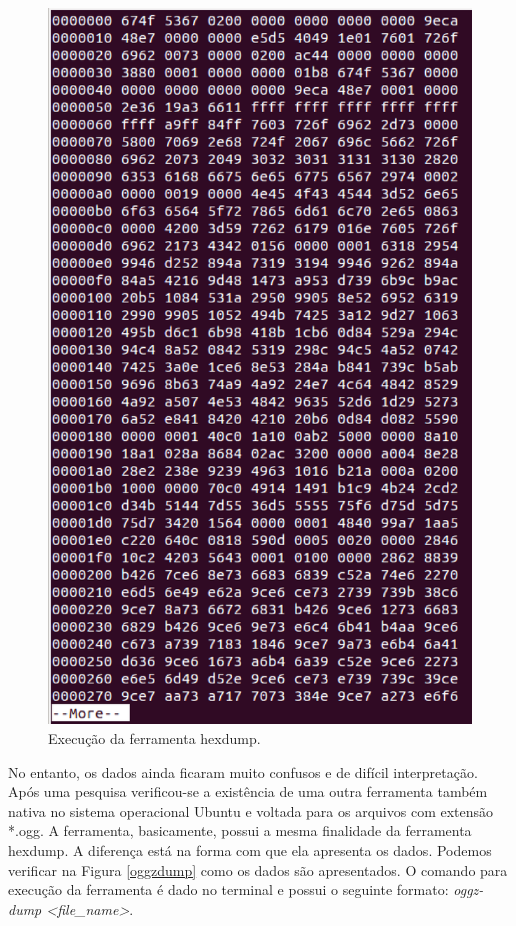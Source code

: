  \begin{figure}[ht]
	\centering
		\includegraphics[keepaspectratio=true,scale=0.5]{figuras/hexdump.eps}
	\caption{Execução da ferramenta hexdump.}
	\label{hexdump}
\end{figure}

No entanto, os dados ainda ficaram muito confusos e de difícil interpretação. Após uma pesquisa verificou-se a existência de uma outra ferramenta também nativa no sistema operacional Ubuntu e voltada para os arquivos com extensão *.ogg. A ferramenta, basicamente, possui a mesma finalidade da ferramenta hexdump. A diferença está na forma com que ela apresenta os dados. Podemos verificar na Figura \ref{oggzdump} como os dados são apresentados. O comando para execução da ferramenta é dado no terminal e possui o seguinte formato: \textit{oggz-dump <file\_name>}.

